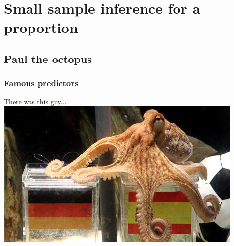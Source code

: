 \section{Small sample inference for a proportion}


\subsection{Paul the octopus}


\begin{frame}
\frametitle{Famous predictors}

{
\pause
There was this guy...
\includegraphics[width=\textwidth]{6-5_small_single_prop/figures/paul/paul}
}

\end{frame}

